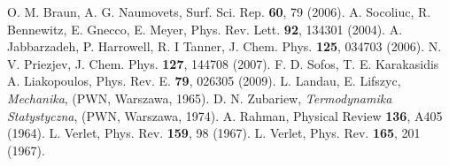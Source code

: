 \begin{thebibliography}{3}
\begin{spacing}{1.0}
 O. M. Braun, A. G. Naumovets, Surf. Sci. Rep. {\bf 60}, 79 (2006).
 A. Socoliuc, R. Bennewitz, E. Gnecco, E. Meyer, Phys. Rev. Lett. {\bf 92}, 134301 (2004).
 A. Jabbarzadeh, P. Harrowell, R. I Tanner, J. Chem. Phys. {\bf 125}, 034703 (2006).
 N. V. Priezjev, J. Chem. Phys. {\bf 127}, 144708 (2007).
 F. D. Sofos, T. E. Karakasidis A. Liakopoulos, Phys. Rev. E. {\bf 79}, 026305 (2009).
 L. Landau, E. Lifszyc, {\it Mechanika}, (PWN, Warszawa, 1965).
 D. N. Zubariew, {\it Termodynamika Statystyczna}, (PWN, Warszawa, 1974).
 A. Rahman, Physical Review {\bf 136}, A405 (1964).
 L. Verlet, Phys. Rev. {\bf 159}, 98 (1967).
 L. Verlet, Phys. Rev. {\bf 165}, 201 (1967).



\end{spacing}
%
%



\end{thebibliography}